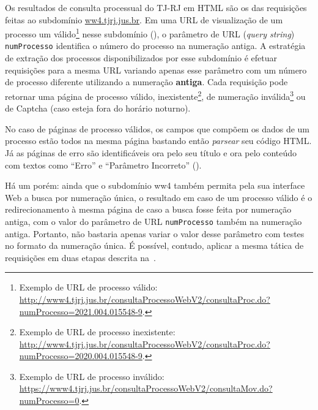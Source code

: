 Os resultados de consulta processual do TJ-RJ em HTML são os das requisições
feitas ao subdomínio \url{ww4.tjrj.jus.br}. Em uma URL de visualização de um
processo um válido\footnote{Exemplo de URL de processo válido:
\url{http://www4.tjrj.jus.br/consultaProcessoWebV2/consultaProc.do?numProcesso=2021.004.015548-9}.}
nesse subdomínio (), o parâmetro de URL
(\textit{query string}) \texttt{numProcesso} identifica o número do processo na
numeração antiga. A estratégia de extração dos processos disponibilizados por
esse subdomínio é efetuar requisições para a mesma URL variando apenas esse
parâmetro com um número de processo diferente utilizando a numeração
\textbf{antiga}. Cada requisição pode retornar uma página de processo válido,
inexistente\footnote{Exemplo de URL de processo inexistente:
\url{http://www4.tjrj.jus.br/consultaProcessoWebV2/consultaProc.do?numProcesso=2020.004.015548-9}.},
de numeração inválida\footnote{Exemplo de URL de processo inválido:
\url{https://www4.tjrj.jus.br/consultaProcessoWebV2/consultaMov.do?numProcesso=0}.}
ou de Captcha (caso esteja fora do horário noturno).

No caso de páginas de processo válidos, os campos que compõem os dados de um
processo estão todos na mesma página bastando então \textit{parsear} seu código
HTML. Já as páginas de erro são identificáveis ora pelo seu título e ora pelo
conteúdo com textos como ``Erro'' e ``Parâmetro Incorreto''
().

Há um porém: ainda que o subdomínio ww4 também permita pela sua interface Web a
busca por numeração única, o resultado em caso de um processo válido é o
redirecionamento à mesma página de caso a busca fosse feita por numeração
antiga, com o valor do parâmetro de URL \texttt{numProcesso} também na
numeração antiga. Portanto, não bastaria apenas variar o valor desse parâmetro
com testes no formato da numeração única. É possível, contudo, aplicar a mesma
tática de requisições em duas etapas descrita
na~.

